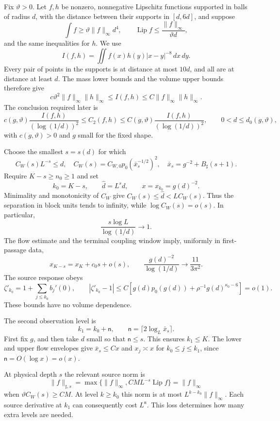 \documentclass[11pt,letterpaper,reqno]{amsart}
\theoremstyle{definition}
\theoremstyle{remark}
\newcommand{\Lip}{\operatorname{Lip}}
\begin{document}
Fix $\vartheta>0$. Let $f,h$ be nonzero, nonnegative Lipschitz
functions supported in balls of radius $d$, with the distance between
their supports in $[d,6d]$, and suppose
\[
 \int f\ge\vartheta\|f\|_\infty d^4,
 \qquad \Lip f\le\frac{\|f\|_\infty}{\vartheta d},
\]
and the same inequalities for $h$. We use
\[
 I(f,h)=\iint f(x)h(y)|x-y|^{-8}\,dx\,dy.
\]
Every pair of points in the supports is at distance at most $10d$,
and all are at distance at least $d$. The mass lower bounds and the
volume upper bounds therefore give
\[
 c\vartheta^2\|f\|_\infty\|h\|_\infty
       \le I(f,h)\le C\|f\|_\infty\|h\|_\infty.
\]
The conclusion required later is
\begin{equation}\label{eq:two-point-comparison}
 c(g,\vartheta)\frac{I(f,h)}{(\log(1/d))^2}
 \le C_2(f,h)\le
 C(g,\vartheta)\frac{I(f,h)}{(\log(1/d))^2},
 \qquad 0<d\le d_0(g,\vartheta),
\end{equation}
with $c(g,\vartheta)>0$ and $g$ small for the fixed shape.

Choose the smallest $s=s(d)$ for which
\[
 C_W(s)L^{-s}\le d,
 \quad C_W(s)=C_{W,0}p_0(\bar x_s^{-1/2})^2,
 \quad \bar x_s=g^{-2}+B_\sharp(s+1).
\]
Require $K-s\ge n_0\ge1$ and set
\[
 k_0=K-s,\qquad \hat d=L^sd,\qquad
 x=x_{k_0}=g(d)^{-2}.
\]
Minimality and monotonicity of $C_W$ give
$C_W(s)\le\hat d<LC_W(s)$. Thus the separation in block units
tends to infinity, while $\log C_W(s)=o(s)$. In particular,
\[
 \frac{s\log L}{\log(1/d)}\longrightarrow1.
\]
The flow estimate and the terminal coupling window imply, uniformly in
first-passage data,
\[
 x_{K-s}=x_K+c_0s+o(s),\qquad
 \frac{g(d)^{-2}}{\log(1/d)}\longrightarrow\frac{11}{3\pi^2}.
\]
The source response obeys
\[
 \zeta'_{k_0}=1+\sum_{j\le k_0}b_j'(0),\qquad
 |\zeta'_{k_0}-1|
   \le C\left[g(d)p_0(g(d))+
                    \rho^{-1}g(d)^{\kappa_0-6}\right]=o(1).
\]
These bounds have no volume dependence.

The second observation level is
\[
 k_1=k_0+\mathsf n,\qquad
 \mathsf n=\lceil2\log_L\bar x_s\rceil.
\]
First fix $g$, and then take $d$ small so that $\mathsf n\le s$.
This ensures $k_1\le K$. The lower and upper flow envelopes give
$\bar x_s\le Cx$ and $x_j\asymp x$ for $k_0\le j\le k_1$,
since $\mathsf n=O(\log x)=o(x)$.

At physical depth $s$ the relevant source norm is
\[
 \|f\|_{\sharp,s}
       =\max\{\|f\|_\infty,CML^{-s}\Lip f\}
       =\|f\|_\infty
\]
when $\vartheta C_W(s)\ge CM$. At level $k\ge k_0$ this norm is
at most $L^{k-k_0}\|f\|_\infty$. Each source derivative at $k_1$
can consequently cost $L^{\mathsf n}$. This loss determines how
many extra levels are needed.
\end{document}
